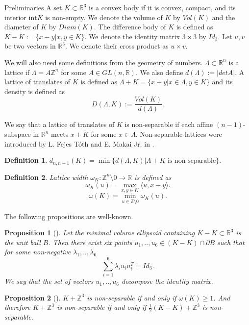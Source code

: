 \documentclass[12pt]{article}
\newcommand\R{\mathbb R}
\newcommand\Z{\mathbb Z}
\newtheorem{proposition}{Proposition}[section]
\newtheorem{definition}{Definition}[section]
\begin{document}
\begin{section}{Preliminaries}
     A set $K\subset\R^{3}$ is a convex body if it is convex, compact, and its interior $\mathrm{int} K$ is non-empty. We denote the volume of $K$ by $Vol(K)$ and the diameter of $K$ by $Diam(K).$
    The difference body of $K$ is defined as $K-K:=\{x-y|x,y\in K\}$. We denote the identity matrix $3\times 3$ by $Id_{3}$. Let $u,v$ be two vectors  in $ \mathbb{R}^{3}$. We denote their cross product as $u\times v.$
     
    We will also need some definitions from the geometry of numbers. $\Lambda\subset \R^{n}$ is a lattice if $\Lambda = A\mathbb{Z}^n$ for some $A\in GL(n,\mathbb{R})$. We also define $d(\Lambda) := |det A|.$ A lattice of translates of $K$ is defined as $\Lambda + K = \{x+y| x\in \Lambda,y\in K\}$ and its density is defined as $$D(\Lambda, K) := \frac{Vol(K)}{d(\Lambda)}.$$     


    We say that a         lattice of translates of $K$ is non-separable if each affine $(n-1)$-subspace in $\R^{n}$ meets $x+K$ for some $x\in\Lambda$. Non-separable lattices were introduced by  L. Fejes T\'oth and E. Makai Jr. in \cite{makai1974}. 
    \begin{definition}
        $d_{n,n-1}(K) = \min\{d(\Lambda,K)| \Lambda+K \text{ is non-separable} \}.$ 
    \end{definition}

    \begin{definition}
        Lattice width $\omega_{K}:\Z^{n}\setminus{0}\to \R$ is defined as 
        $$
        \omega_{K}(u)=\max_{x,y\in K}\langle u, x-y\rangle.
        $$
        $$
            \omega(K) = \min_{u\in \mathbb{Z}\setminus 0} \omega_{K}(u).
        $$
    \end{definition}

    The following propositions are well-known.
    \begin{proposition}[\cite{ball}]
        Let the minimal volume ellipsoid containing $K-K\subset\mathbb{R}^{3}$ is the unit ball $B$. Then there exist six points $u_{1},..,u_{6}\in (K-K)\cap \partial B$ such that for some non-negative $\lambda_{1},..,\lambda_{6}$ 
        $$
            \sum_{i=1}^{6}\lambda_{i}u_{i}u_{i}^{T} = Id_{3}.
        $$
    We say that the set of vectors $u_{1},..,u_{6}$ decompose the identity matrix.  
    \end{proposition}

    \begin{proposition}
    [\cite{makai1974}]
        $K+\Z^{3}$ is non-separable if and only if $\omega(K)\geq 1$.  And therefore $K+\Z^{3}$ is non-separable if and only if $\frac{1}{2}(K-K)+\Z^{3}$ is non-separable.  
    \end{proposition}


\end{section}
\end{document}
